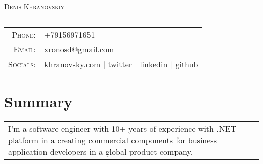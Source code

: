 \documentclass[a4paper,11pt]{article}
\newcommand{\sotag}[1]{\tikz[baseline]{\node[anchor=base, rounded corners=0.5ex, text height=1.5ex, text depth=.25ex, fill=tagbg, draw=tagbg, text=tagtxt] {#1};}}
\begin{document}
\par{\centering
		{\Huge \textsc{Denis Khranovskiy}
	}\bigskip\par}

\hrule
\vspace{0.5em}
\begin{tabular}{rl}
  \textsc{Phone:}     & +79156971651\\
  \textsc{Email:}     & \href{mailto:xronosd@gmail.com}{xronosd@gmail.com}\\
  \textsc{Socials:}   & \faHome{} \href{https://khranovsky.com}{khranovsky.com} 
                      | \faTwitter{} \href{https://twitter.com/xronosd}{twitter} 
                      | \faLinkedin{} \href{https://www.linkedin.com/in/denis-khranovskiy/}{linkedin}
                      | \faGithub{} \href{https://github.com/khranovskiy/}{github}
\end{tabular}

\section{Summary}
\begin{tabular}{p{}}
  I’m a software engineer with 10+ years of experience with .NET platform in a creating
  commercial components for business application developers in a global product company. 

  
  

  
\end{tabular}
\end{document}
